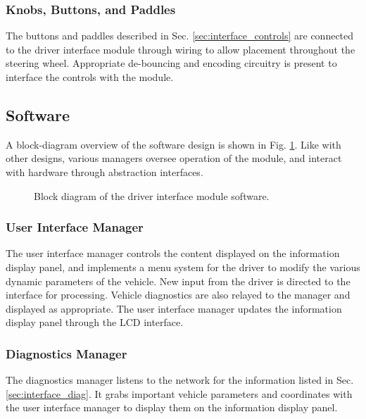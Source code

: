 \subsubsection{Knobs, Buttons, and Paddles}

The buttons and paddles described in Sec. \ref{sec:interface_controls} are connected to the driver interface module through wiring to allow placement throughout the steering wheel. Appropriate de-bouncing and encoding circuitry is present to interface the controls with the module. 

\subsection{Software}

A block-diagram overview of the software design is shown in Fig. \ref{fig:interface_software_design_block}. Like with other designs, various managers oversee operation of the module, and interact with hardware through abstraction interfaces.

\vspace{1em}
\begin{figure}[H]
	\centering
	
	\caption{Block diagram of the driver interface module software.}
	\label{fig:interface_software_design_block}
\end{figure}

\subsubsection{User Interface Manager}

The user interface manager controls the content displayed on the information display panel, and implements a menu system for the driver to modify the various dynamic parameters of the vehicle. New input from the driver is directed to the interface for processing. Vehicle diagnostics are also relayed to the manager and displayed as appropriate. The user interface manager updates the information display panel through the LCD interface.

\subsubsection{Diagnostics Manager}

The diagnostics manager listens to the network for the information listed in Sec. \ref{sec:interface_diag}. It grabs important vehicle parameters and coordinates with the user interface manager to display them on the information display panel.

